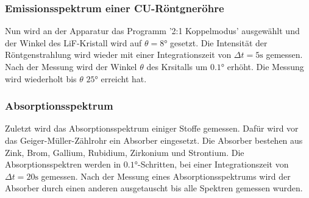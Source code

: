 \subsubsection{Emissionsspektrum einer CU-Röntgneröhre}
Nun wird an der Apparatur das Programm '2:1 Koppelmodus' ausgewählt und der Winkel des LiF-Kristall wird auf $\theta = 8 \si{\degree}$ gesetzt.
Die Intensität der Röntgenstrahlung wird wieder mit einer Integrationszeit von $\Delta t = 5 \si{\second}$ gemessen.
Nach der Messung wird der Winkel $\theta$ des Krsitalls um $0.1 \si{\degree}$ erhöht.
Die Messung wird wiederholt bis $\theta$ $25\si{\degree}$ erreicht hat.

\subsubsection{Absorptionsspektrum}
Zuletzt wird das Absorptionsspektrum einiger Stoffe gemessen.
Dafür wird vor das Geiger-Müller-Zählrohr ein Absorber eingesetzt.
Die Absorber bestehen aus Zink, Brom, Gallium, Rubidium, Zirkonium und Strontium.
Die Absorptionsspektren werden in $0.1\si{\degree}$-Schritten, bei einer Integrationszeit von $\Delta t = 20 \si{\second}$ gemessen.
Nach der Messung eines Absorptionsspektrums wird der Absorber durch einen anderen ausgetauscht bis alle Spektren gemessen wurden.

